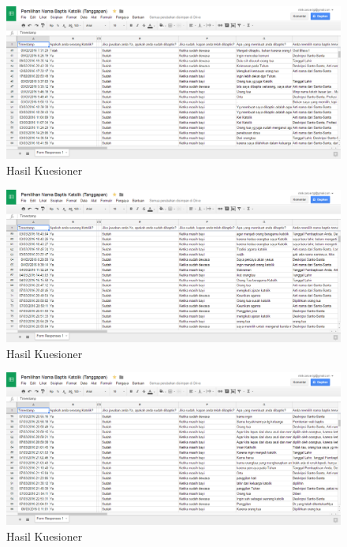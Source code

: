 	\begin{figure}[htbp]
		\centering
			\includegraphics[scale=0.38]{Gambar/kuesioner3.PNG}
			\caption{Hasil Kuesioner}
		\label{fig:kues3}
	\end{figure}
	
	\begin{figure}[htbp]
		\centering
			\includegraphics[scale=0.38]{Gambar/kuesioner4.PNG}
			\caption{Hasil Kuesioner}
		\label{fig:kues4}
	\end{figure}
	
	\begin{figure}[htbp]
		\centering
			\includegraphics[scale=0.38]{Gambar/kuesioner5.PNG}
			\caption{Hasil Kuesioner}
		\label{fig:kues5}
	\end{figure}
	
